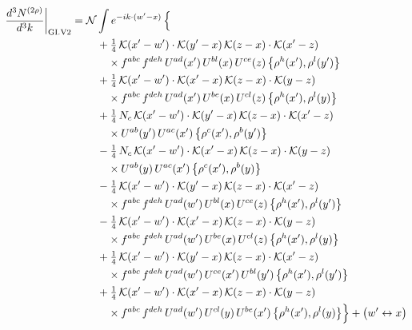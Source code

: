 \documentclass[10pt]{article}
\numberwithin{equation}{section}
\newcommand{\KK}{\mathcal K}
\newcommand{\NN}{\mathcal N}
\begin{document}
\begin{align}
\frac{d^3N^{(2\rho)}}{d^3k}\bigg|_{\rm GI.V2}={}&\NN\int e^{-ik\cdot(w'-x)}\,\Big\{\notag\\
&\quad +\tfrac14\,\KK(x'-w')\cdot\KK(y'-x)\,\KK(z-x)\cdot\KK(x'-z)\notag\\
&\qquad\times f^{abc}\,f^{deh}\,U^{ad}(x')\,U^{bl}(x)\,U^{ce}(z)\,\big\{\rho^{h}(x'),\rho^{l}(y')\big\}\notag\\
&\quad +\tfrac14\,\KK(x'-w')\cdot\KK(x'-x)\,\KK(z-x)\cdot\KK(y-z)\notag\\
&\qquad\times f^{abc}\,f^{deh}\,U^{ad}(x')\,U^{be}(x)\,U^{cl}(z)\,\big\{\rho^{h}(x'),\rho^{l}(y)\big\}\notag\\
&\quad +\tfrac14\,N_{c}\,\KK(x'-w')\cdot\KK(y'-x)\,\KK(z-x)\cdot\KK(x'-z)\notag\\
&\qquad\times U^{ab}(y')\,U^{ac}(x')\,\big\{\rho^{c}(x'),\rho^{b}(y')\big\}\notag\\
&\quad -\tfrac14\,N_{c}\,\KK(x'-w')\cdot\KK(x'-x)\,\KK(z-x)\cdot\KK(y-z)\notag\\
&\qquad\times U^{ab}(y)\,U^{ac}(x')\,\big\{\rho^{c}(x'),\rho^{b}(y)\big\}\notag\\
&\quad -\tfrac14\,\KK(x'-w')\cdot\KK(y'-x)\,\KK(z-x)\cdot\KK(x'-z)\notag\\
&\qquad\times f^{abc}\,f^{deh}\,U^{ad}(w')\,U^{bl}(x)\,U^{ce}(z)\,\big\{\rho^{h}(x'),\rho^{l}(y')\big\}\notag\\
&\quad -\tfrac14\,\KK(x'-w')\cdot\KK(x'-x)\,\KK(z-x)\cdot\KK(y-z)\notag\\
&\qquad\times f^{abc}\,f^{deh}\,U^{ad}(w')\,U^{be}(x)\,U^{cl}(z)\,\big\{\rho^{h}(x'),\rho^{l}(y)\big\}\notag\\
&\quad +\tfrac14\,\KK(x'-w')\cdot\KK(y'-x)\,\KK(z-x)\cdot\KK(x'-z)\notag\\
&\qquad\times f^{abc}\,f^{deh}\,U^{ad}(w')\,U^{ce}(x')\,U^{bl}(y')\,\big\{\rho^{h}(x'),\rho^{l}(y')\big\}\notag\\
&\quad +\tfrac14\,\KK(x'-w')\cdot\KK(x'-x)\,\KK(z-x)\cdot\KK(y-z)\notag\\
&\qquad\times f^{abc}\,f^{deh}\,U^{ad}(w')\,U^{cl}(y)\,U^{be}(x')\,\big\{\rho^{h}(x'),\rho^{l}(y)\big\}\Big\}+\big(w'\leftrightarrow x\big)\label{R:eq:sum-GI.V2}
\end{align}
\end{document}
